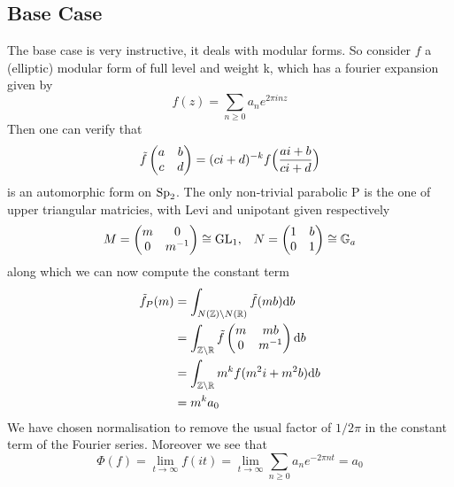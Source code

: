 \subsection{Base Case}
The base case is very instructive, it deals with modular forms. So consider \(f\) a (elliptic) modular form of full level and weight k, which has a fourier expansion given by 
\[f(z) = \sum_{n\geq 0} a_ne^{2\pi i nz }\]
Then one can verify that
\[\tilde f \begin{pmatrix}
    a & b\\
    c & d
\end{pmatrix} = (ci+d)^{-k} f\Bigl(\frac{ai+b}{ci+d}\Bigr)\]
is an automorphic form on \(\operatorname{Sp}_2\). The only non-trivial parabolic P is the one of upper triangular matricies, with Levi and unipotant given respectively 
\[M = \begin{pmatrix} m & 0\\ 0 & m^{-1}\end{pmatrix}\cong \operatorname{GL}_1 , \;\;\; N = \begin{pmatrix} 1 & b\\ 0 & 1\end{pmatrix} \cong \mathbb{G}_a\]
along which we can now compute the constant term 
\begin{equation*}
    \begin{aligned}
		\tilde f_P(m)
		& = \int_{N(\Z)\backslash N(\R)}\tilde f (mb) \mathrm{d}b\\
		& =  \int_{\Z\backslash\R}\tilde f \begin{pmatrix} m & mb\\ 0 & m^{-1}\end{pmatrix}\mathrm{d}b\\
		& = \int_{\Z\backslash\R} m^k f(m^2i+m^2b) \mathrm{d}b\\
            & = m^k a_0 \\
	\end{aligned}
\end{equation*}
We have chosen normalisation to remove the usual factor of \(1/2\pi\) in the constant term of the Fourier series. Moreover we see that
\[\Phi(f)= \lim_{t\to \infty} f(it) =\lim_{t\to \infty} \sum_{n\geq 0} a_ne^{-2\pi nt }  =  a_0\]

